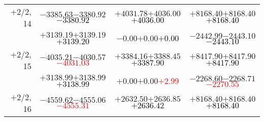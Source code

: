 \documentclass[compress]{beamer}
\begin{document}
\begin{frame}
{\begin{tabular}{r | c | c | c}
$+$2/2, 14 & $-3385.63$\hspace{0.1 cm}$-3380.92$\hspace{0.1 cm}\textcolor{black}{$-3380.92$} & $+4031.78$\hspace{0.1 cm}$+4036.00$\hspace{0.1 cm}\textcolor{black}{$+4036.00$} & $+8168.40$\hspace{0.1 cm}$+8168.40$\hspace{0.1 cm}\textcolor{black}{$+8168.40$} \\
           & $+3139.19$\hspace{0.1 cm}$+3139.19$\hspace{0.1 cm}\textcolor{black}{$+3139.20$} & $-0.00$\hspace{0.1 cm}$+0.00$\hspace{0.1 cm}\textcolor{black}{$+0.00$} & $-2442.99$\hspace{0.1 cm}$-2443.10$\hspace{0.1 cm}\textcolor{black}{$-2443.10$} \\
$+$2/2, 15 & $-4035.21$\hspace{0.1 cm}$-4030.57$\hspace{0.1 cm}\textcolor{red}{$-4031.03$} & $+3384.16$\hspace{0.1 cm}$+3388.45$\hspace{0.1 cm}\textcolor{black}{$+3387.90$} & $+8417.90$\hspace{0.1 cm}$+8417.90$\hspace{0.1 cm}\textcolor{black}{$+8417.90$} \\
           & $+3138.99$\hspace{0.1 cm}$+3138.99$\hspace{0.1 cm}\textcolor{black}{$+3138.99$} & $+0.00$\hspace{0.1 cm}$+0.00$\hspace{0.1 cm}\textcolor{red}{$+2.99$} & $-2268.60$\hspace{0.1 cm}$-2268.71$\hspace{0.1 cm}\textcolor{red}{$-2270.55$} \\
$+$2/2, 16 & $-4559.62$\hspace{0.1 cm}$-4555.06$\hspace{0.1 cm}\textcolor{red}{$-4555.31$} & $+2632.50$\hspace{0.1 cm}$+2636.85$\hspace{0.1 cm}\textcolor{black}{$+2636.42$} & $+8168.40$\hspace{0.1 cm}$+8168.40$\hspace{0.1 cm}\textcolor{black}{$+8168.40$} \\

\end{tabular}}
\end{frame}
\end{document}
